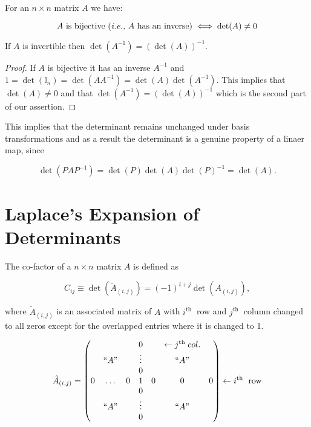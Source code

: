 \documentclass[a4paper,12pt]{report}
\begin{document}
\begin{corollary}\label{invertibledeterminant} 

For an \(n \times n\) matrix \(A\) we have:

\begin{equation}
    A \text{ is bijective (\textit{i.e.,} \(A\) has an inverse)} \iff \det (A) \neq 0  
\end{equation}

If \(A\) is invertible then \(\det (A^{-1} ) = (\det (A))^{-1} \). 
  
\end{corollary}

\begin{proof}
If $A$ is bijective it has an inverse $A^{-1}$ and $1 = \det(\mathbb{I}_n) = \det(AA^{-1}) = \det(A) \det(A^{-1})$. This implies that $\det(A) \neq 0$ and that $\det(A^{-1}) = (\det(A))^{-1}$ which is the second part of our assertion.
\end{proof}

This implies that the determinant remains unchanged under basis transformations and as a result the determinant is a genuine property of a linaer map, since

\begin{equation}
    \det (PAP^{-1} ) = \det (P)\det (A)\det (P)^{-1} =\det (A).
\end{equation}

\section{Laplace's Expansion of Determinants}


The co-factor of a \(n \times n\) matrix \(A\) is defined as 

\begin{equation}
    C_{ij} \equiv \det (\tilde{A}_{(i,j)}  ) = (-1)^{i+j} \det (A_{(i,j)} ) ,
\end{equation}

where \(\tilde{A}_{(i,j)} \) is an associated matrix of \(A\) with \(i^{\text{th }} \) row and \(j^{\text{th }} \) column changed to all zeros except for the overlapped entries where it is changed to 1.  

\begin{equation}
    \tilde{A}_{(i,j)} = 
\begin{pmatrix}
     &  &  & 0 &  & \leftarrow  j^{\text{th }} col. &   \\
     & ``A\text{''}  &  & \vdots  &  & ``A\text{''}  &   \\
     &  &  & 0 &  &  &   \\
    0 & \ldots  & 0 & 1 & 0 & 0 & 0  \\
     &  &  & 0 &  &  &   \\
     & ``A\text{''}  &  & \vdots  &  & ``A\text{''}  &   \\
     &  &  & 0 &  &  &   \\
\end{pmatrix}
\leftarrow i^{\text{th }}  \text{ row}
\end{equation}
\end{document}
